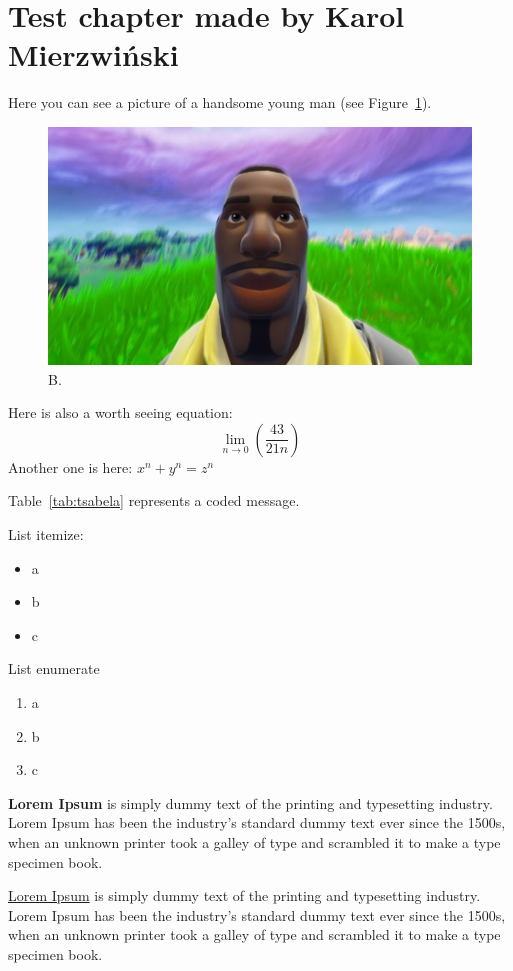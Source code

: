 \section{Test chapter made by Karol Mierzwiński}
\label{sec:karol}

Here you can see a picture of a handsome young man (see Figure~\ref{fig:man}).

\begin{figure}[htbp]
\centering
\includegraphics[width=1\textwidth]{Pictures/zdjecie.jpeg}
\caption{B.}
\label{fig:man}
\end{figure}

Here is also a worth seeing equation: \[\lim_{n \to 0}(\frac{43}{21n})\]
Another one is here:
$ x^n + y^n = z^n $

\newpage

Table~\ref{tab:tsabela} represents a coded message.



List itemize:

\begin{itemize}
  \item a
  \item b
  \item c
\end{itemize}

List enumerate

\begin{enumerate}
  \item a
  \item b
  \item c
\end{enumerate}

\textbf{Lorem Ipsum} is simply dummy text of the printing and typesetting industry. Lorem Ipsum has been the industry's standard dummy text ever since the 1500s, when an unknown printer took a galley of type and scrambled it to make a type specimen book.\par
\underline{Lorem Ipsum} is simply dummy text of the printing and typesetting industry. Lorem Ipsum has been the industry's standard dummy text ever since the 1500s, when an unknown printer took a galley of type and scrambled it to make a type specimen book.\\[\baselineskip]

\newpage




